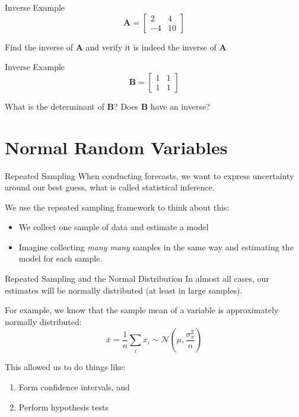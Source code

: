 \documentclass[aspectratio=169,t,11pt,table]{beamer}
\begin{document}
\begin{frame}{Inverse Example}
  $$
    \bm{A} = \begin{bmatrix} 2 & 4 \\ -4 & 10 \end{bmatrix}
  $$

  Find the inverse of $\bm{A}$ and verify it is indeed the inverse of $\bm{A}$
\end{frame}
\begin{frame}{Inverse Example}
  $$
    \bm{B} = \begin{bmatrix} 1 & 1 \\ 1 & 1 \end{bmatrix}
  $$

  What is the determinant of $\bm{B}$? Does $\bm{B}$ have an inverse?
\end{frame}



\section{Normal Random Variables}

\begin{frame}{Repeated Sampling}
  When conducting forecasts, we want to express uncertainty around our best guess, what is called \alert{statistical inference}.

  \bigskip
  We use the \alert{repeated sampling} framework to think about this:
  \begin{itemize}
    \item We collect one sample of data and estimate a model
    
    \item Imagine collecting \emph{many many} samples in the same way and estimating the model for each sample.
  \end{itemize}
\end{frame}  

\begin{frame}{Repeated Sampling and the Normal Distribution}
  In almost all cases, our estimates will be \alert{normally distributed} (at least in large samples).

  \bigskip
  For example, we know that the sample mean of a variable is approximately normally distributed:
  $$
    \bar{x} = \frac{1}{n} \sum_{i} x_i \sim \mathcal{N}(\mu, \frac{\sigma_x^2}{n})
  $$

  \pause
  \bigskip
  This allowed us to do things like:
  \begin{enumerate}
    \item Form confidence intervals, and
    
    \item Perform hypothesis tests
  \end{enumerate}
\end{frame}
\end{document}
